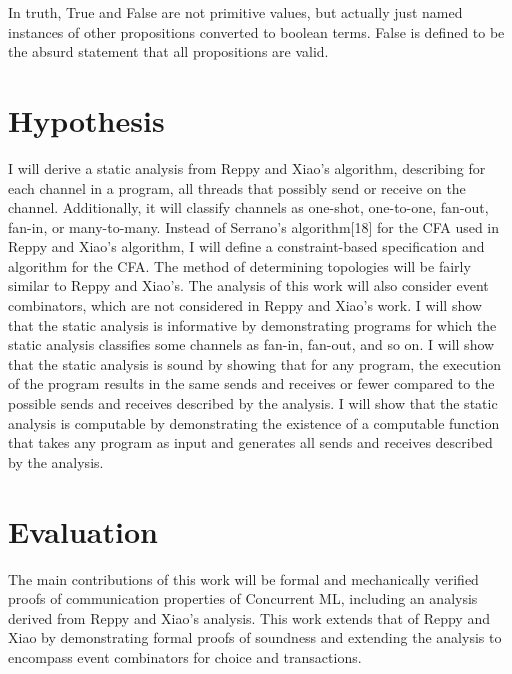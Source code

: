 \documentclass{article}
\begin{document}
In truth, True and False are not primitive values, but actually just named instances of other
propositions converted to boolean terms.   False is defined to be the absurd statement that all
propositions are valid.


\section{Hypothesis}
I will derive a static analysis from Reppy and Xiao's algorithm, describing for each channel in
a program, all threads that possibly send or receive on the channel.  Additionally, it will
classify channels as one-shot, one-to-one, fan-out, fan-in, or many-to-many.  Instead of
Serrano's algorithm[18] for the CFA used in Reppy and Xiao's algorithm, I will define a
constraint-based specification and algorithm for the CFA.  The method of determining topologies
will be fairly similar to Reppy and Xiao's.  The analysis of this work will also consider event
combinators, which are not considered in Reppy and Xiao's work.  I will show that the static
analysis is informative by demonstrating programs for which the static analysis classifies some
channels as fan-in, fan-out, and so on.  I will show that the static analysis is sound by
showing that for any program, the execution of the program results in the same sends and
receives or fewer compared to the possible sends and receives described by the analysis.  I
will show that the static analysis is computable by demonstrating the existence of a
computable function that takes any program as input and generates all sends and receives
described by the analysis.


\section{Evaluation}
The main contributions of this work will be formal and mechanically verified proofs of
communication properties of Concurrent ML, including an analysis derived from Reppy and Xiao's
analysis.  This work extends that of Reppy and Xiao by demonstrating formal proofs of soundness
and extending the analysis to encompass event combinators for choice and transactions.
\end{document}
